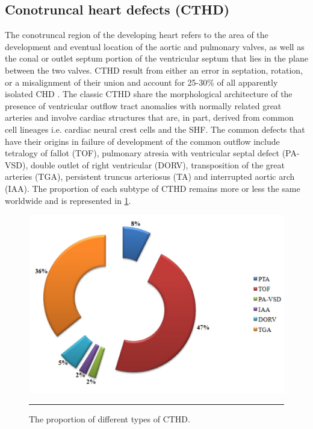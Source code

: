 \begin{refsection}
\section{Conotruncal heart defects (CTHD)}

The conotruncal region of the developing heart refers to the area of the development and eventual location of the aortic and pulmonary valves, as well as the conal or outlet septum portion of the ventricular septum that lies in the plane between the two valves. CTHD result from either an error in septation, rotation, or a misalignment of their union and account for 25-30\% of all apparently isolated CHD \cite{srivastava2006genetic}.
The classic CTHD share the morphological architecture of the presence of ventricular outflow tract anomalies with normally related great arteries and involve cardiac structures that are, in part, derived from common cell lineages i.e. cardiac neural crest cells and the SHF. The common defects that have their origins in failure of development of the common outflow include tetralogy of fallot (TOF), pulmonary atresia with ventricular septal defect (PA-VSD), double outlet of right ventricular (DORV), transposition of the great arteries (TGA), persistent truncus arteriosus (TA) and interrupted aortic arch (IAA). The proportion of each subtype of CTHD remains more or less the same worldwide and is represented in \cref{fig:1_2}.


\begin{figure}[!tb]
\centering
\includegraphics[scale=0.5,keepaspectratio]{Figures/Figure1_2.pdf}
\rule{35em}{0.5pt}
\caption{The proportion of different types of CTHD. \cite{pierpont2007genetic}}
\label{fig:1_2}
\end{figure}


\end{refsection}
